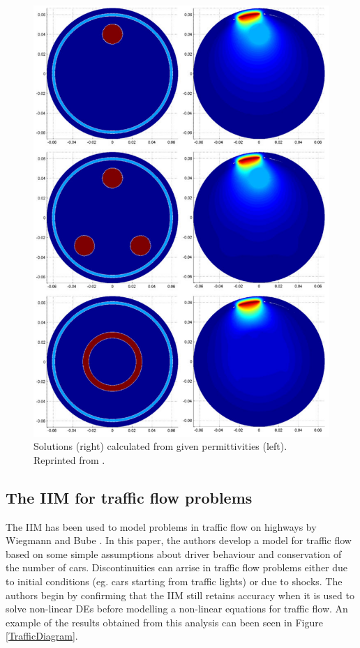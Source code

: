 \begin{figure}[h!]
    \centering
    \includegraphics{diagrams/ECTDiagram.png}
    \caption{Solutions (right) calculated from given permittivities (left). Reprinted from \cite{alvarezchenli11}.}
    \label{ECTDiagram}
\end{figure}

\newpage
\clearpage
\subsection{The IIM for traffic flow problems}
The IIM has been used to model problems in traffic flow on highways by Wiegmann and Bube \cite{wiegmannbube98}.
In this paper, the authors develop a model for traffic flow based on some simple assumptions about driver behaviour and conservation of the number of cars.
Discontinuities can arrise in traffic flow problems either due to initial conditions (eg. cars starting from traffic lights) or due to shocks.
The authors begin by confirming that the IIM still retains accuracy when it is used to solve non-linear DEs before modelling a non-linear equations for traffic flow.
An example of the results obtained from this analysis can been seen in Figure \ref{TrafficDiagram}.

